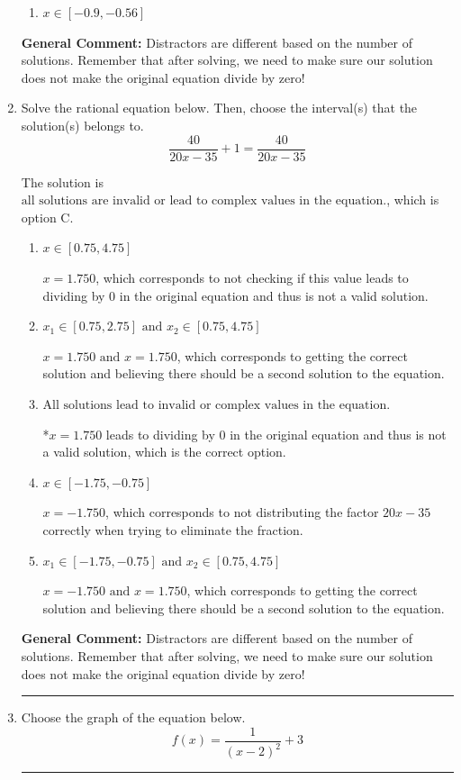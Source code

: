 \documentclass{extbook}[14pt]
\newcommand{\litem}[1]{\item #1

\rule{\textwidth}{0.4pt}}
\begin{document}
\begin{enumerate}
{\begin{enumerate}[label=\Alph*.]
* $x = 0.283 \text{ and } x = -1.360$, which is the correct option.
\item \( x \in [-0.9,-0.56] \)


\end{enumerate}

\textbf{General Comment:} Distractors are different based on the number of solutions. Remember that after solving, we need to make sure our solution does not make the original equation divide by zero!
}
\litem{
Solve the rational equation below. Then, choose the interval(s) that the solution(s) belongs to.
\[ \frac{40}{20x -35} + 1 = \frac{40}{20x -35} \]

The solution is \( \text{all solutions are invalid or lead to complex values in the equation.} \), which is option C.\begin{enumerate}[label=\Alph*.]
\item \( x \in [0.75,4.75] \)

$x = 1.750$, which corresponds to not checking if this value leads to dividing by 0 in the original equation and thus is not a valid solution.
\item \( x_1 \in [0.75, 2.75] \text{ and } x_2 \in [0.75,4.75] \)

$x = 1.750 \text{ and } x = 1.750$, which corresponds to getting the correct solution and believing there should be a second solution to the equation.
\item \( \text{All solutions lead to invalid or complex values in the equation.} \)

*$x = 1.750$ leads to dividing by 0 in the original equation and thus is not a valid solution, which is the correct option.
\item \( x \in [-1.75,-0.75] \)

$x = -1.750$, which corresponds to not distributing the factor $20x -35$ correctly when trying to eliminate the fraction.
\item \( x_1 \in [-1.75, -0.75] \text{ and } x_2 \in [0.75,4.75] \)

$x = -1.750 \text{ and } x = 1.750$, which corresponds to getting the correct solution and believing there should be a second solution to the equation.
\end{enumerate}

\textbf{General Comment:} Distractors are different based on the number of solutions. Remember that after solving, we need to make sure our solution does not make the original equation divide by zero!
}
\litem{
Choose the graph of the equation below.
\[ f(x) = \frac{1}{(x - 2)^2} + 3 \]

}
\end{enumerate}
\end{document}
